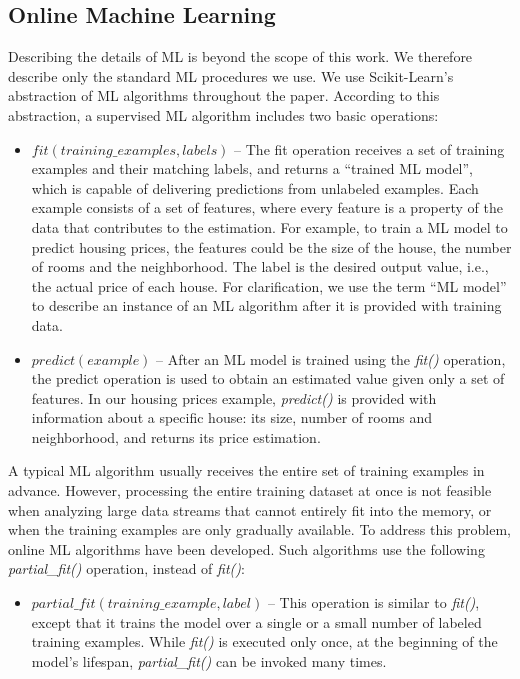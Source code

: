 	\subsection{Online Machine Learning}
	
		Describing the details of ML is beyond the scope of this work. We therefore describe only the standard ML procedures we use. We use Scikit-Learn's abstraction of ML algorithms \cite{pedregosa2011scikit} throughout the paper. According to this abstraction, a supervised ML algorithm includes two basic operations:
		
		\begin{itemize}
			\item $fit(training\_examples, labels)$ -- The fit operation receives a set of training examples and their matching labels, and returns a ``trained ML model'', which is capable of delivering predictions from unlabeled examples. Each example consists of a set of features, where every feature is a property of the data that contributes to the estimation. For example, to train a ML model to predict housing prices, the features could be the size of the house, the number of rooms and the neighborhood. The label is the desired output value, i.e., the actual price of each house. For clarification, we use the term ``ML model'' to describe an instance of an ML algorithm after it is provided with training data.  
			
			\item $predict(example)$ -- After an ML model is trained using the \emph{fit()} operation, the predict operation is used to obtain an estimated value given only a set of features. In our housing prices example, \emph{predict()} is provided with information about a specific house: its size, number of rooms and neighborhood, and returns its price estimation.
		\end{itemize}
		
		A typical ML algorithm usually receives the entire set of training examples in advance. However, processing the entire training dataset at once is not feasible when analyzing large data streams that cannot entirely fit into the memory, or when the training examples are only gradually available. To address this problem, online ML algorithms have been developed. Such algorithms use the following \emph{partial\_fit()} operation, instead of \emph{fit()}:
		\begin{itemize}
			\item $partial\_fit(training\_example, label)$ -- This operation is similar to \emph{fit()}, except that it trains the model over a single or a small number of labeled training examples. While \emph{fit()} is executed only once, at the beginning of the model's lifespan, \emph{partial\_fit()} can be invoked many times.
		\end{itemize}
		
